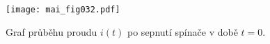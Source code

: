     \begin{figure}[ht!]
      \centering
      \texttt{[image: mai\_fig032.pdf]}
      \caption{Graf průběhu proudu $i(t)$ po sepnutí spínače v době $t=0$.}
      \label{mai:fig032}
    \end{figure}
